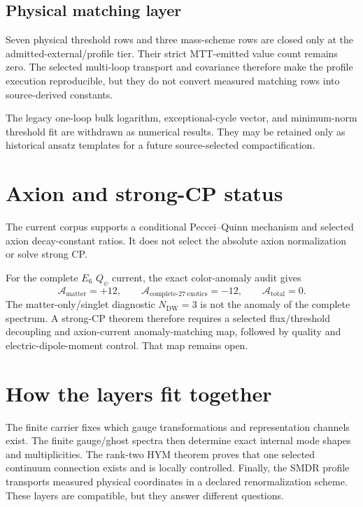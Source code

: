 \documentclass[11pt]{article}
\begin{document}
\subsection{Physical matching layer}

Seven physical threshold rows and three mass-scheme rows are closed only at the
admitted-external/profile tier. Their strict MTT-emitted value count remains
zero. The selected multi-loop transport and covariance therefore make the
profile execution reproducible, but they do not convert measured matching rows
into source-derived constants.

The legacy one-loop bulk logarithm, exceptional-cycle vector, and minimum-norm
threshold fit are withdrawn as numerical results. They may be retained only as
historical ansatz templates for a future source-selected compactification.

\section{Axion and strong-CP status}

The current corpus supports a conditional Peccei--Quinn mechanism and selected
axion decay-constant ratios. It does not select the absolute axion
normalization or solve strong CP.

For the complete $E_6$ $Q_\psi$ current, the exact color-anomaly audit gives
\[
\mathcal A_{\mathrm{matter}}=+12,
\qquad
\mathcal A_{\mathrm{complete\mbox{-}27\ exotics}}=-12,
\qquad
\mathcal A_{\mathrm{total}}=0.
\]
The matter-only/singlet diagnostic $N_{\mathrm{DW}}=3$ is not the anomaly of the
complete spectrum. A strong-CP theorem therefore requires a selected
flux/threshold decoupling and axion-current anomaly-matching map, followed by
quality and electric-dipole-moment control. That map remains open.

\section{How the layers fit together}

The finite carrier fixes which gauge transformations and representation
channels exist. The finite gauge/ghost spectra then determine exact internal
mode shapes and multiplicities. The rank-two HYM theorem proves that one
selected continuum connection exists and is locally controlled. Finally, the
SMDR profile transports measured physical coordinates in a declared
renormalization scheme. These layers are compatible, but they answer different
questions.
\end{document}
